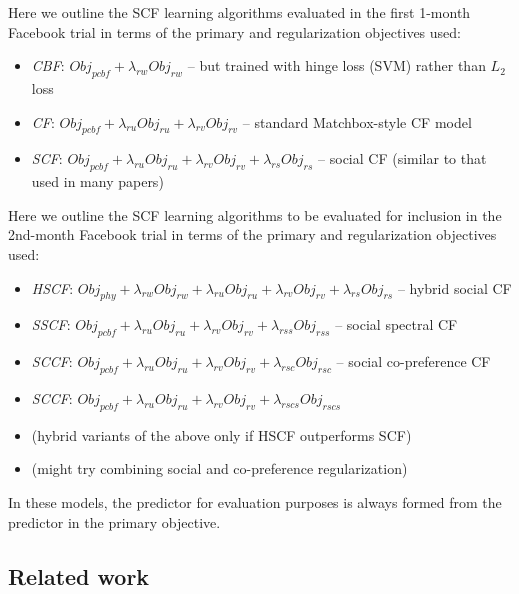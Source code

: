 \documentclass[11pt,a4paper]{article}
\newcommand{\Obj}{\mathit{Obj}}
\newcommand{\pcbf}{\mathit{pcbf}}
\newcommand{\phy}{\mathit{phy}}
\newcommand{\ru}{\mathit{ru}}
\newcommand{\rv}{\mathit{rv}}
\newcommand{\rw}{\mathit{rw}}
\newcommand{\rs}{\mathit{rs}}
\newcommand{\rss}{\mathit{rss}}
\newcommand{\rsc}{\mathit{rsc}}
\newcommand{\rscs}{\mathit{rscs}}
\begin{document}
Here we outline the SCF learning algorithms evaluated in the first
1-month Facebook trial in terms of
the primary and regularization objectives used:
\begin{itemize}
\item {\it CBF}: $\Obj_\pcbf + \lambda_\rw \Obj_\rw$ -- but trained with hinge loss (SVM) rather than $L_2$ loss
\item {\it CF}: $\Obj_\pcbf + \lambda_\ru \Obj_\ru + \lambda_\rv \Obj_\rv$ -- standard Matchbox-style CF model
\item {\it SCF}: $\Obj_\pcbf + \lambda_\ru \Obj_\ru + \lambda_\rv \Obj_\rv + \lambda_\rs \Obj_\rs$ -- social CF (similar to that used in many papers)
\end{itemize}

Here we outline the SCF learning algorithms to be evaluated for inclusion
in the 2nd-month Facebook trial in terms of
the primary and regularization objectives used:
\begin{itemize}
\item {\it HSCF}: $\Obj_\phy + \lambda_\rw \Obj_\rw + \lambda_\ru \Obj_\ru + \lambda_\rv \Obj_\rv + \lambda_\rs \Obj_\rs$ -- hybrid social CF
\item {\it SSCF}: $\Obj_\pcbf + \lambda_\ru \Obj_\ru + \lambda_\rv \Obj_\rv + \lambda_\rss \Obj_\rss$ -- social spectral CF
\item {\it SCCF}: $\Obj_\pcbf + \lambda_\ru \Obj_\ru + \lambda_\rv \Obj_\rv + \lambda_\rsc \Obj_\rsc$ -- social co-preference CF
\item {\it SCCF}: $\Obj_\pcbf + \lambda_\ru \Obj_\ru + \lambda_\rv \Obj_\rv + \lambda_\rscs \Obj_\rscs$
\item (hybrid variants of the above only if HSCF outperforms SCF)
\item (might try combining social and co-preference regularization)
\end{itemize}
In these models, the predictor for evaluation purposes is always
formed from the predictor in the primary objective.

\subsection{Related work}
\end{document}
